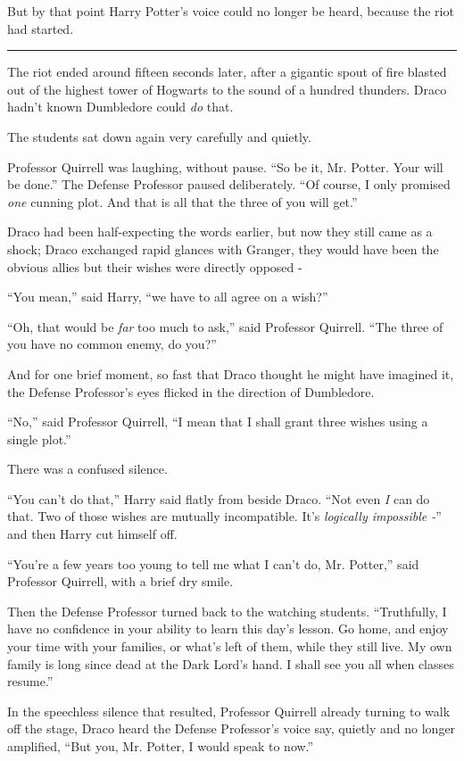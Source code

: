 But by that point Harry Potter's voice could no longer be heard, because the riot had started.

\begin{center}\rule{3in}{0.4pt}\end{center}

The riot ended around fifteen seconds later, after a gigantic spout of fire blasted out of the highest tower of Hogwarts to the sound of a hundred thunders. Draco hadn't known Dumbledore could \emph{do} that.

The students sat down again very carefully and quietly.

Professor Quirrell was laughing, without pause. ``So be it, Mr. Potter. Your will be done.'' The Defense Professor paused deliberately. ``Of course, I only promised \emph{one} cunning plot. And that is all that the three of you will get.''

Draco had been half-expecting the words earlier, but now they still came as a shock; Draco exchanged rapid glances with Granger, they would have been the obvious allies but their wishes were directly opposed -

``You mean,'' said Harry, ``we have to all agree on a wish?''

``Oh, that would be \emph{far} too much to ask,'' said Professor Quirrell. ``The three of you have no common enemy, do you?''

And for one brief moment, so fast that Draco thought he might have imagined it, the Defense Professor's eyes flicked in the direction of Dumbledore.

``No,'' said Professor Quirrell, ``I mean that I shall grant three wishes using a single plot.''

There was a confused silence.

``You can't do that,'' Harry said flatly from beside Draco. ``Not even \emph{I} can do that. Two of those wishes are mutually incompatible. It's \emph{logically impossible -}'' and then Harry cut himself off.

``You're a few years too young to tell me what I can't do, Mr. Potter,'' said Professor Quirrell, with a brief dry smile.

Then the Defense Professor turned back to the watching students. ``Truthfully, I have no confidence in your ability to learn this day's lesson. Go home, and enjoy your time with your families, or what's left of them, while they still live. My own family is long since dead at the Dark Lord's hand. I shall see you all when classes resume.''

In the speechless silence that resulted, Professor Quirrell already turning to walk off the stage, Draco heard the Defense Professor's voice say, quietly and no longer amplified, ``But you, Mr. Potter, I would speak to now.''
